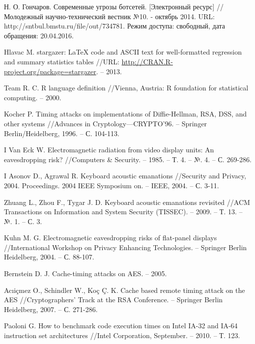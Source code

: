 \begingroup
\renewcommand{\section}[2]{\anonsection{Библиографический список}}
\begin{thebibliography}{00}

    Н. О. Гончаров.
    Современные угрозы ботсетей. [Электронный ресурс] // Молодежный научно-технический вестник №10. - октябрь 2014.
    URL: http://sntbul.bmstu.ru/file/out/734781.
    Режим доступа: свободный, дата обращения: 20.04.2016.

  Hlavac M. stargazer: LaTeX code and ASCII text for well-formatted regression and summary statistics tables //URL: \url{http://CRAN.R-project.org/package=stargazer}. – 2013.

  Team R. C. R language definition //Vienna, Austria: R foundation for statistical computing. – 2000.

  Kocher P. Timing attacks on implementations of Diffie-Hellman, RSA, DSS, and other systems //Advances in Cryptology—CRYPTO’96. – Springer Berlin/Heidelberg, 1996. – С. 104-113.

I Van Eck W. Electromagnetic radiation from video display units: An eavesdropping risk? //Computers \& Security. – 1985. – Т. 4. – №. 4. – С. 269-286.

I Asonov D., Agrawal R. Keyboard acoustic emanations //Security and Privacy, 2004. Proceedings. 2004 IEEE Symposium on. – IEEE, 2004. – С. 3-11.

  Zhuang L., Zhou F., Tygar J. D. Keyboard acoustic emanations revisited //ACM Transactions on Information and System Security (TISSEC). – 2009. – Т. 13. – №. 1. – С. 3.

  Kuhn M. G. Electromagnetic eavesdropping risks of flat-panel displays //International Workshop on Privacy Enhancing Technologies. – Springer Berlin Heidelberg, 2004. – С. 88-107.

  Bernstein D. J. Cache-timing attacks on AES. – 2005.

  Acıiçmez O., Schindler W., Koç Ç. K. Cache based remote timing attack on the AES //Cryptographers’ Track at the RSA Conference. – Springer Berlin Heidelberg, 2007. – С. 271-286.

  Paoloni G. How to benchmark code execution times on Intel IA-32 and IA-64 instruction set architectures //Intel Corporation, September. – 2010. – Т. 123.


\end{thebibliography}
